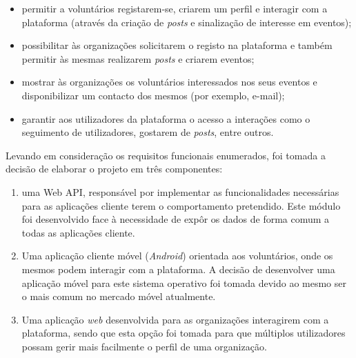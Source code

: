 \begin{itemize}
	\item permitir a voluntários registarem-se, criarem um perfil e interagir com a plataforma (através da criação de \textit{posts} e sinalização de interesse em eventos);
	\item possibilitar às organizações solicitarem o registo na plataforma e também permitir às mesmas realizarem \textit{posts} e criarem eventos;
	\item mostrar às organizações os voluntários interessados nos seus eventos e disponibilizar um contacto dos mesmos (por exemplo, e-mail);
	\item garantir aos utilizadores da plataforma o acesso a interações como o seguimento de utilizadores, gostarem de \textit{posts}, entre outros.
\end{itemize}

Levando em consideração os requisitos funcionais enumerados, foi tomada a decisão de elaborar o projeto em três componentes: 
\begin{enumerate}
	\item uma Web API, responsável por implementar as funcionalidades necessárias para as aplicações cliente terem o comportamento pretendido. Este módulo foi desenvolvido face à necessidade de expôr os dados de forma comum a todas as aplicações cliente.
	\item Uma aplicação cliente móvel (\textit{Android}) orientada aos voluntários, onde os mesmos podem interagir com a plataforma.	A decisão de desenvolver uma aplicação móvel para este sistema operativo foi tomada devido ao mesmo ser o mais comum no mercado móvel atualmente.
	\item Uma aplicação \textit{web} desenvolvida para as organizações interagirem com a plataforma, sendo que esta opção foi tomada para que múltiplos utilizadores possam gerir mais facilmente o perfil de uma organização.
\end{enumerate}